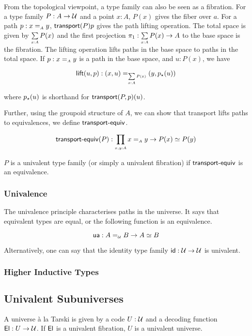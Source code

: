 From the topological viewpoint, a type family can also be seen as a fibration. For a type family $P : A \to \mathcal{U}$ and a
point $x : A$, $P(x)$ gives the fiber over $a$. For a path $p : x \id_{A} y$, $\operatorname{\mathsf{transport}}({P}){p}$ gives the path lifting
operation. The total space is given by $\dsum{x:A}{P(x)}$ and the first projection $\pi_1 : \dsum{x:A}{P(x)} \to A$ to
the base space is the fibration. The lifting operation lifts paths in the base space to paths in the total space. If
$p : x \id_{A} y$ is a path in the base space, and $u : P(x)$, we have

\[
  \term{lift}(u,p) : (x , u) \id_{\dsum{x:A}{P(x)}} (y , \tr{p}{u})
\]

where ${p}_{\star}({u})$ is shorthand for $\operatorname{\mathsf{transport}}({P,p})(u)$.

Further, using the groupoid structure of $A$, we can show that transport lifts paths to equivalences, we define
$\operatorname{\mathsf{transport-equiv}}$.

\[
  \term{transport-equiv}(P) : \dfun{x,y:A}{x \id_{A} y \to P(x) \eqv P(y)}
\]

\begin{definition}
  $P$ is a univalent type family (or simply a univalent fibration) if
  $\operatorname{\mathsf{transport-equiv}}$ is an equivalence.
\end{definition}

\subsubsection{Univalence}

The univalence principle characterises paths in the universe. It says that equivalent types are equal, or the following
function is an equivalence.

\[
  \ua : A \id_{\UU} B \to A \eqv B
\]

Alternatively, one can say that the identity type family $\operatorname{\mathsf{id}} : \mathcal{U} \to \mathcal{U}$ is univalent.

\subsubsection{Higher Inductive Types}

\subsection{Univalent Subuniverses}

\begin{definition}[Universe]
  A universe \`{a} la Tarski is given by a code $U : \mathcal{U}$ and a decoding function $\operatorname{\mathsf{El}} : U \to \mathcal{U}$. If $\operatorname{\mathsf{El}}$ is a
  univalent fibration, $U$ is a univalent universe.
\end{definition}

